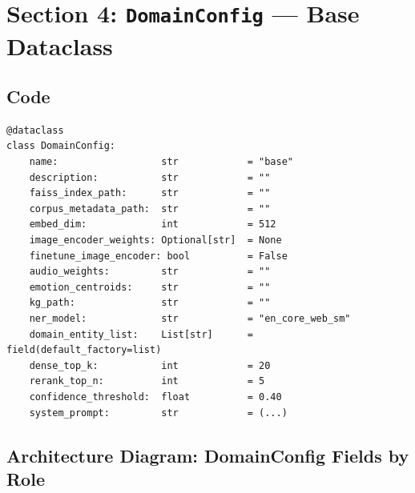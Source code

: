\documentclass[12pt,a4paper]{article}
\theoremstyle{definition}
\theoremstyle{remark}
\begin{document}
\section{Section 4: \texttt{DomainConfig} — Base Dataclass}

\subsection{Code}

\begin{lstlisting}[caption={\texttt{DomainConfig} base dataclass}]
@dataclass
class DomainConfig:
    name:                  str            = "base"
    description:           str            = ""
    faiss_index_path:      str            = ""
    corpus_metadata_path:  str            = ""
    embed_dim:             int            = 512
    image_encoder_weights: Optional[str]  = None
    finetune_image_encoder: bool          = False
    audio_weights:         str            = ""
    emotion_centroids:     str            = ""
    kg_path:               str            = ""
    ner_model:             str            = "en_core_web_sm"
    domain_entity_list:    List[str]      = field(default_factory=list)
    dense_top_k:           int            = 20
    rerank_top_n:          int            = 5
    confidence_threshold:  float          = 0.40
    system_prompt:         str            = (...)
\end{lstlisting}

\subsection{Architecture Diagram: DomainConfig Fields by Role}
\end{document}
